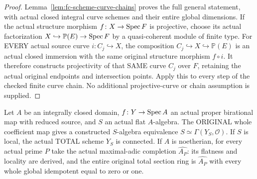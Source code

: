 \begin{proof}
Lemma~\ref{lem:fc-scheme-curve-chains} proves the full general statement, with actual closed integral
curve schemes and their entire global dimensions. If the actual structure morphism $f\colon X\to\operatorname{Spec} F$
is projective, choose its actual factorization $X\hookrightarrow\mathbb P(E)\to\operatorname{Spec} F$ by a quasi-coherent
module of finite type. For EVERY actual source curve $i\colon C_j\hookrightarrow X$, the composition
$C_j\hookrightarrow X\hookrightarrow\mathbb P(E)$ is an actual closed immersion with the same original
structure morphism $f\circ i$. It therefore constructs projectivity of that SAME curve $C_j$ over $F$,
retaining the actual original endpoints and intersection points. Apply this to every step of the checked
finite curve chain. No additional projective-curve or chain assumption is supplied.
\end{proof}

\begin{lemma}\label{lem:fc-proper-birational-flat-sections}
\leanok
{}
Let $A$ be an integrally closed domain, $f\colon Y\to\operatorname{Spec} A$ an actual proper birational map with
reduced source, and $S$ an actual flat $A$-algebra. The ORIGINAL whole coefficient map gives a constructed
$S$-algebra equivalence $S\simeq\Gamma(Y_S,\mathcal O)$. If $S$ is local, the actual TOTAL scheme $Y_S$
is connected. If $A$ is noetherian, for every actual prime $P$ take the actual maximal-adic completion
$\widehat{A_P}$: its flatness and locality are derived, and the entire original total section ring
is $\widehat{A_P}$ with every whole global idempotent equal to zero or one.
\end{lemma}

